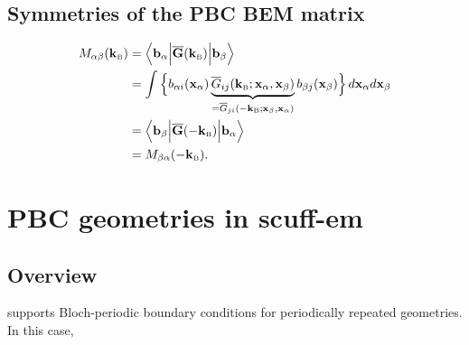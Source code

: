 \subsection{Symmetries of the PBC BEM matrix}

\begin{align*}
 M_{\alpha\beta}(\mathbf{k}_{\hbox{\tiny{B}}})
&= \Big \langle \mathbf{b}_\alpha \Big|
    \overline{\mathbf{G}}(\mathbf{k}_{\hbox{\tiny{B}}})
   \Big| \mathbf{b}_\beta \Big\rangle
\\
&= \int 
   \Big\{ 
   b_{\alpha i}(\mathbf{x}_\alpha) 
   \underbrace{\overline{G}_{ij}(\mathbf{k}_{\hbox{\tiny{B}}}; \mathbf{x}_\alpha , \mathbf{x}_\beta)}
             _{=\overline{G}_{ji}(-\mathbf{k}_{\hbox{\tiny{B}}}; \mathbf{x}_\beta , \mathbf{x}_\alpha )}
   b_{\beta j}(\mathbf{x}_\beta) 
   \Big\}\, d\mathbf{x}_\alpha d\mathbf{x}_\beta
\\
&= \Big \langle \mathbf{b}_\beta\Big|
    \overline{\mathbf{G}}(-\mathbf{k}_{\hbox{\tiny{B}}})
   \Big| \mathbf{b}_\alpha\Big\rangle
\\
&=M_{\beta\alpha}(-\mathbf{k}_{\hbox{\tiny{B}}}).
\end{align*}

\section{PBC geometries in {\sc scuff-em}}

\subsection{Overview}

\lss supports Bloch-periodic boundary conditions for
periodically repeated geometries. In this case,

